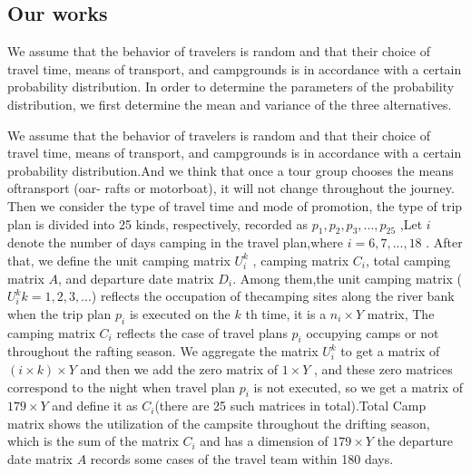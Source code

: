 \subsection{Our works}
\noindent
We assume that the behavior of travelers is random and that their choice of travel time, means of transport, and campgrounds is in accordance with a certain probability distribution. In order to determine the parameters of the probability distribution, we first determine the mean and variance of the three alternatives.
\par We assume that the behavior of travelers is random and that their choice of travel time, means of transport, and campgrounds is in accordance with a certain probability distribution.And we think that once a tour group chooses the means oftransport (oar- rafts or motorboat), it will not change throughout the journey. Then we consider the type of travel time and mode of promotion, the type of trip plan is divided into 25 kinds, respectively, recorded as ${p_1},{p_2},{p_3},...,{p_{25}}$ ,Let $i$ denote the number of days camping in the travel plan,where $i = 6,7,...,18$ . After that, we define the unit camping matrix $U_i^k$ , camping matrix ${C_i}$, total camping matrix $A$, and departure date matrix ${D_i}$. Among them,the unit camping matrix ($U_i^k$$k = 1,2,3,...$) reflects the occupation of thecamping sites along the river bank when the trip plan ${p_i}$ is executed on the $k$ th time, it is a ${n_i} \times Y$ matrix, The camping matrix ${C_i}$ reflects the case of travel plans ${p_i}$ occupying camps or not throughout the rafting season. We aggregate the matrix $U_i^k$ to get a matrix of $(i \times k) \times Y$ and then we add the zero matrix of $1 \times Y$  , and these zero matrices correspond to the night when travel plan ${p_i}$ is not executed, so we get a matrix of $179 \times Y$ and define it as ${C_i}$(there are 25 such matrices in total).Total Camp matrix shows the utilization of the campsite throughout the drifting season, which is the sum of the matrix ${C_i}$ and has a dimension of $179 \times Y$ the departure date matrix $A$ records some cases of the travel team within 180 days.      
$$
